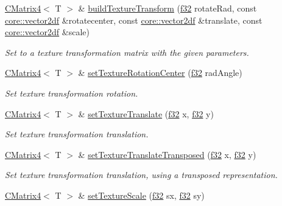 \begin{DoxyCompactItemize}
\hyperlink{classirr_1_1core_1_1CMatrix4}{C\+Matrix4}$<$ T $>$ \& \hyperlink{classirr_1_1core_1_1CMatrix4_afc72faaf2c883d9c0fdc1e0940d1acde}{build\+Texture\+Transform} (\hyperlink{namespaceirr_a0277be98d67dc26ff93b1a6a1d086b07}{f32} rotate\+Rad, const \hyperlink{namespaceirr_1_1core_a116f90bd31515724b6235014ee2b74d5}{core\+::vector2df} \&rotatecenter, const \hyperlink{namespaceirr_1_1core_a116f90bd31515724b6235014ee2b74d5}{core\+::vector2df} \&translate, const \hyperlink{namespaceirr_1_1core_a116f90bd31515724b6235014ee2b74d5}{core\+::vector2df} \&scale)
\begin{DoxyCompactList}\small\item\em Set to a texture transformation matrix with the given parameters. \end{DoxyCompactList}\item 
\hyperlink{classirr_1_1core_1_1CMatrix4}{C\+Matrix4}$<$ T $>$ \& \hyperlink{classirr_1_1core_1_1CMatrix4_a445a7653292ae4ffb0baa50032a8674e}{set\+Texture\+Rotation\+Center} (\hyperlink{namespaceirr_a0277be98d67dc26ff93b1a6a1d086b07}{f32} rad\+Angle)
\begin{DoxyCompactList}\small\item\em Set texture transformation rotation. \end{DoxyCompactList}\item 
\hyperlink{classirr_1_1core_1_1CMatrix4}{C\+Matrix4}$<$ T $>$ \& \hyperlink{classirr_1_1core_1_1CMatrix4_a2bab9633697a892f08d89c7aeee6daf6}{set\+Texture\+Translate} (\hyperlink{namespaceirr_a0277be98d67dc26ff93b1a6a1d086b07}{f32} x, \hyperlink{namespaceirr_a0277be98d67dc26ff93b1a6a1d086b07}{f32} y)
\begin{DoxyCompactList}\small\item\em Set texture transformation translation. \end{DoxyCompactList}\item 
\hyperlink{classirr_1_1core_1_1CMatrix4}{C\+Matrix4}$<$ T $>$ \& \hyperlink{classirr_1_1core_1_1CMatrix4_a7d999210cc7427e9d744271e50d26c3c}{set\+Texture\+Translate\+Transposed} (\hyperlink{namespaceirr_a0277be98d67dc26ff93b1a6a1d086b07}{f32} x, \hyperlink{namespaceirr_a0277be98d67dc26ff93b1a6a1d086b07}{f32} y)
\begin{DoxyCompactList}\small\item\em Set texture transformation translation, using a transposed representation. \end{DoxyCompactList}\item 
\hyperlink{classirr_1_1core_1_1CMatrix4}{C\+Matrix4}$<$ T $>$ \& \hyperlink{classirr_1_1core_1_1CMatrix4_aed32a7a8da9c4cee5babe8f6b4aa7dd4}{set\+Texture\+Scale} (\hyperlink{namespaceirr_a0277be98d67dc26ff93b1a6a1d086b07}{f32} sx, \hyperlink{namespaceirr_a0277be98d67dc26ff93b1a6a1d086b07}{f32} sy)

\end{DoxyCompactItemize}

